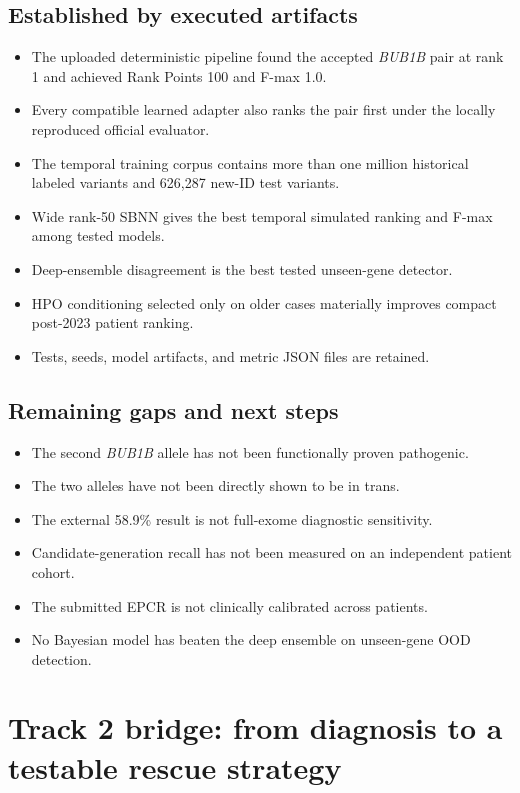 \documentclass[11pt]{article}
\begin{document}
\subsection{Established by executed artifacts}
\begin{itemize}
\item The uploaded deterministic pipeline found the accepted \textit{BUB1B} pair at rank 1 and achieved Rank Points 100 and F-max 1.0.
\item Every compatible learned adapter also ranks the pair first under the locally reproduced official evaluator.
\item The temporal training corpus contains more than one million historical labeled variants and 626,287 new-ID test variants.
\item Wide rank-50 SBNN gives the best temporal simulated ranking and F-max among tested models.
\item Deep-ensemble disagreement is the best tested unseen-gene detector.
\item HPO conditioning selected only on older cases materially improves compact post-2023 patient ranking.
\item Tests, seeds, model artifacts, and metric JSON files are retained.
\end{itemize}

\subsection{Remaining gaps and next steps}
\begin{itemize}
\item The second \textit{BUB1B} allele has not been functionally proven pathogenic.
\item The two alleles have not been directly shown to be in trans.
\item The external 58.9\% result is not full-exome diagnostic sensitivity.
\item Candidate-generation recall has not been measured on an independent patient cohort.
\item The submitted EPCR is not clinically calibrated across patients.
\item No Bayesian model has beaten the deep ensemble on unseen-gene OOD detection.
\end{itemize}
\section{Track 2 bridge: from diagnosis to a testable rescue strategy}
\end{document}
